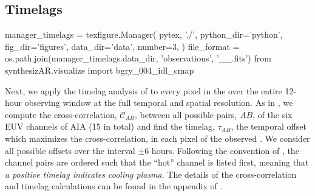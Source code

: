 \subsection{Timelags}\label{sec:timelags}

\begin{pycode}
manager_timelags = texfigure.Manager(
    pytex, './',
    python_dir='python',
    fig_dir='figures',
    data_dir='data',
    number=3,
)
file_format = os.path.join(manager_timelags.data_dir, 'observations', '{}_{}_{}.fits')
from synthesizAR.visualize import bgry_004_idl_cmap
\end{pycode}


Next, we apply the timelag analysis of \citet{viall_evidence_2012} to every pixel in the \AR{} over the entire 12-hour observing window at the full temporal and spatial resolution. As in , we compute the cross-correlation, $\mathcal{C}_{AB}$, between all possible pairs, $AB$, of the six EUV channels of AIA (15 in total) and find the timelag, $\tau_{AB}$, the temporal offset which maximizes the cross-correlation, in each pixel of the observed \AR{}. We consider all possible offsets over the interval $\pm6$ hours. Following the convention of \citet{viall_evidence_2012}, the channel pairs are ordered such that the ``hot'' channel is listed first, meaning that \textit{a positive timelag indicates cooling plasma}. The details of the cross-correlation and timelag calculations can be found in the appendix of .

